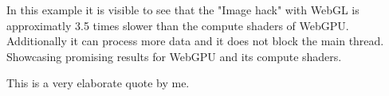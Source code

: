 In this example it is visible to see that the "Image hack" with WebGL is approximatly 3.5 times slower than the compute shaders of WebGPU.
Additionally it can process more data and it does not block the main thread.
Showcasing promising results for WebGPU and its compute shaders.


\label{chap:Performance}

\begin{displayquote}
  This is a very elaborate quote by me.
\end{displayquote}
